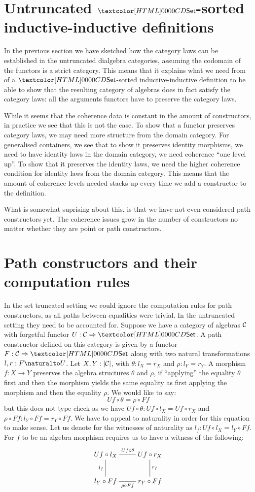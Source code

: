 \section{Untruncated $\Set$-sorted inductive-inductive definitions}

In the previous section we have sketched how the category laws can be
established in the untruncated dialgebra categories, assuming the
codomain of the functors is a strict category. This means that it
explains what we need from of a $\Set$-sorted inductive-inductive
definition to be able to show that the resulting category of algebras
does in fact satisfy the category laws: all the arguments functors
have to preserve the category laws.

While it seems that the coherence data is constant in the amount of
constructors, in practice we see that this is not the case. To show
that a functor preserves category laws, we may need more structure
from the domain category. For generalised containers, we see that to
show it preserves identity morphisms, we need to have identity laws in
the domain category, \ie we need coherence ``one level up''. To show
that it preserves the identity laws, we need the higher coherence
condition for identity laws from the domain category. This means that
the amount of coherence levels needed stacks up every time we add a
constructor to the definition.

What is somewhat suprising about this, is that we have not even
considered path constructors yet. The coherence issues grow in the
number of constructors no matter whether they are point or path
constructors.

\section{Path constructors and their computation rules}

In the set truncated setting we could ignore the computation rules for
path constructors, as all paths between equalities were trivial. In
the untruncated setting they need to be accounted for. Suppose we have
a category of algebras $\mathcal{C}$ with forgetful functor
$U : \Func{\Cc}{\Set}$. A path constructor defined on this category is
given by a functor $F : \Func{\Cc}{\Set}$ along with two natural
transformations $l,r : \Nat{F}{U}$. Let $X, Y : | \mathcal{C} |$, with
$\theta : l_X = r_X$ and $\rho : l_Y = r_Y$. A morphism $f : X \to Y$
preserves the algebra structures $\theta$ and $\rho$, if ``applying''
the equality $\theta$ first and then the morphism yields the same
equality as first applying the morphism and then the equality
$\rho$. We would like to say:
$$
U f \circ \theta = \rho \circ F f
$$
but this does not type check as we have
$U f \circ \theta : U f \circ l_X = U f \circ r_X$ and
$\rho \circ Ff : l_Y \circ F f = r_Y \circ F f$. We have to appeal to
naturality in order for this equation to make sense. Let us denote for
the witnesses of naturality as $l_f : Uf \circ l_X = l_Y \circ
Ff$.
For $f$ to be an algebra morphism requires us to have a witness of the
following:
$$
\xymatrix{
U f \circ l_X
\ar@{-}[r]^{U f \circ \theta}
\ar@{-}[d]_{l_f}
&U f \circ r_X
\ar@{-}[d]^{r_f}
\\
l_Y \circ Ff
\ar@{-}[r]_{\rho \circ Ff}
&r_Y \circ Ff
}
$$
